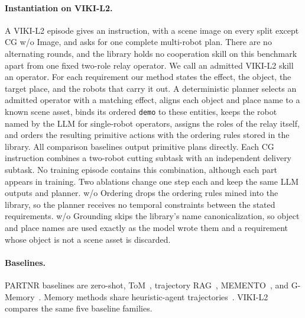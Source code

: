 \documentclass{article}
\theoremstyle{plain}
\theoremstyle{definition}
\theoremstyle{remark}
\begin{document}
\paragraph{Instantiation on VIKI-L2.}
A VIKI-L2 episode gives an instruction, with a scene image on every split except CG w/o Image, and asks for one complete multi-robot plan. There are no alternating rounds, and the library holds no cooperation skill on this benchmark apart from one fixed two-role relay operator. We call an admitted VIKI-L2 skill an operator. For each requirement our method states the effect, the object, the target place, and the robots that carry it out. A deterministic planner selects an admitted operator with a matching effect, aligns each object and place name to a known scene asset, binds its ordered \texttt{demo} to these entities, keeps the robot named by the LLM for single-robot operators, assigns the roles of the relay itself, and orders the resulting primitive actions with the ordering rules stored in the library. All comparison baselines output primitive plans directly. Each CG instruction combines a two-robot cutting subtask with an independent delivery subtask. No training episode contains this combination, although each part appears in training. Two ablations change one step each and keep the same LLM outputs and planner. w/o Ordering drops the ordering rules mined into the library, so the planner receives no temporal constraints between the stated requirements. w/o Grounding skips the library's name canonicalization, so object and place names are used exactly as the model wrote them and a requirement whose object is not a scene asset is discarded.
 
 
\paragraph{Baselines.}
PARTNR baselines are zero-shot, ToM~\citep{li2023theory}, trajectory RAG~\citep{lewis2020retrieval}, MEMENTO~\citep{kwon2026memento}, and G-Memory~\citep{zhang2025g}. Memory methods share heuristic-agent trajectories~\citep{PARTNR}. VIKI-L2 compares the same five baseline families.
 
\end{document}
